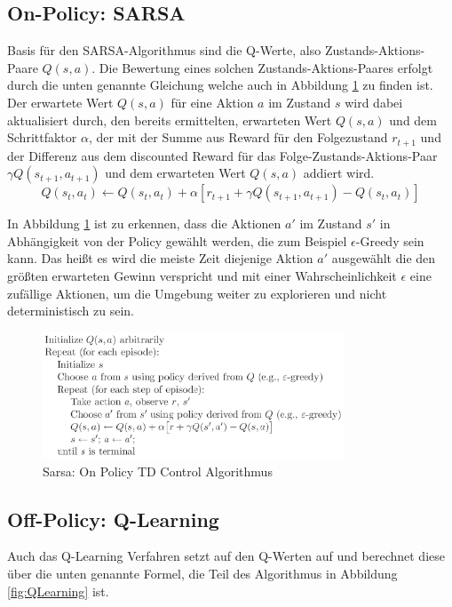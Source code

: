 \documentclass[10pt]{scrartcl}
\begin{document}
\subsection{On-Policy: SARSA}
Basis für den SARSA-Algorithmus sind die Q-Werte, also Zustands-Aktions-Paare $Q(s,a)$. Die Bewertung eines solchen Zustands-Aktions-Paares erfolgt durch die unten genannte Gleichung welche auch in Abbildung \ref{fig:Sarsa} zu finden ist.\\
Der erwartete Wert $Q(s,a)$ für eine Aktion $a$ im Zustand $s$ wird dabei aktualisiert durch, den bereits ermittelten, erwarteten Wert $Q(s,a)$ und dem Schrittfaktor $\alpha$, der mit der Summe aus Reward für den Folgezustand $r_{t+1}$ und der Differenz aus dem discounted Reward für das Folge-Zustands-Aktions-Paar $\gamma Q(s_{t+1}, a_{t+1})$ und dem erwarteten Wert $Q(s,a)$ addiert wird.\\

\begin{equation}
Q(s_{t},a_{t}) \leftarrow Q(s_{t},a_{t}) + \alpha [r_{t+1} + \gamma Q(s_{t+1},a_{t+1}) - Q(s_{t},a_{t})]
\end{equation}

In Abbildung \ref{fig:Sarsa} ist zu erkennen, dass die Aktionen $a'$ im Zustand $s'$ in Abhängigkeit von der Policy gewählt werden, die zum Beispiel $\epsilon$-Greedy sein kann. Das heißt es wird die meiste Zeit diejenige Aktion $a'$ ausgewählt die den größten erwarteten Gewinn verspricht und mit einer Wahrscheinlichkeit $\epsilon$ eine zufällige Aktionen, um die Umgebung weiter zu explorieren und nicht deterministisch zu sein.

\begin{figure}[htbp]
	\centering	\includegraphics[width=0.8\textwidth]{Bilder/Sarsa.png}
	\caption{Sarsa: On Policy TD Control Algorithmus}
	\label{fig:Sarsa}
\end{figure}


\subsection{Off-Policy: Q-Learning}
Auch das Q-Learning Verfahren setzt auf den Q-Werten auf und berechnet diese über die unten genannte Formel, die Teil des Algorithmus in Abbildung \ref{fig:QLearning} ist.
\end{document}

